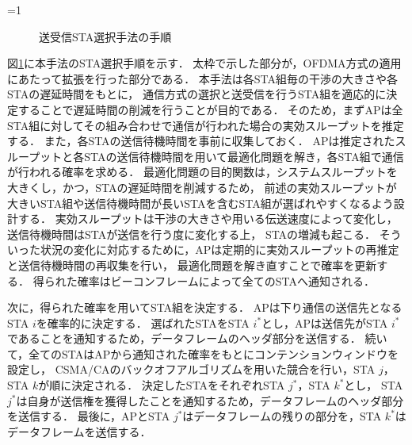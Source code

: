 \documentclass[master]{kuisthesis}		%
\newcommand{\sij}{(i,j)}
\def\equiv{\mathrel{\mathop:}=}
\newcommand{\sijk}{(i,j,k)}
\newcommand{\rijk}{r^{(i,j,k)}}
\newcounter{flagFig}
\begin{document}
				\ifnum\value{flagFig}=1 {\begin{figure}[htbp]
					\centering
					\caption{送受信STA選択手法の手順}
					\label{fig:process}
				\end{figure}}\fi
				図\ref{fig:process}に本手法のSTA選択手順を示す．
				太枠で示した部分が，OFDMA方式の適用にあたって拡張を行った部分である．
				本手法は各STA組毎の干渉の大きさや各STAの遅延時間をもとに，
				通信方式の選択と送受信を行うSTA組を適応的に決定することで遅延時間の削減を行うことが目的である．
				そのため，まずAPは全STA組に対してその組み合わせで通信が行われた場合の実効スループットを推定する．
				また，各STAの送信待機時間を事前に収集しておく．
				APは推定されたスループットと各STAの送信待機時間を用いて最適化問題を解き，各STA組で通信が行われる確率を求める．
				最適化問題の目的関数は，システムスループットを大きくし，かつ，STAの遅延時間を削減するため，
				前述の実効スループットが大きいSTA組や送信待機時間が長いSTAを含むSTA組が選ばれやすくなるよう設計する．
				実効スループットは干渉の大きさや用いる伝送速度によって変化し，送信待機時間はSTAが送信を行う度に変化する上，
				STAの増減も起こる．
				そういった状況の変化に対応するために，APは定期的に実効スループットの再推定と送信待機時間の再収集を行い，
				最適化問題を解き直すことで確率を更新する．
				得られた確率はビーコンフレームによって全てのSTAへ通知される．
				\par
				次に，得られた確率を用いてSTA組を決定する．
				APは下り通信の送信先となるSTA $i$を確率的に決定する．
				選ばれたSTAをSTA $i^*$とし，APは送信先がSTA $i^*$であることを通知するため，データフレームのヘッダ部分を送信する．
				続いて，全てのSTAはAPから通知された確率をもとにコンテンションウィンドウを設定し，
				CSMA/CAのバックオフアルゴリズムを用いた競合を行い，STA $j$，STA $k$が順に決定される．
				決定したSTAをそれぞれSTA $j^*$，STA $k^*$とし，
				STA $j^*$は自身が送信権を獲得したことを通知するため，データフレームのヘッダ部分を送信する．
				最後に，APとSTA $j^*$はデータフレームの残りの部分を，STA $k^*$はデータフレームを送信する．
\end{document}
